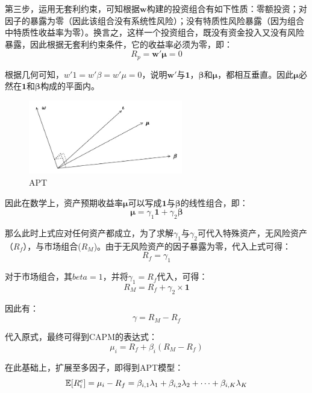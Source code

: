 \documentclass[11pt]{article}
\begin{document}
\begin{appendices}
第三步，运用无套利约束，可知根据$\bm{w}$构建的投资组合有如下性质：零额投资；对因子的暴露为零（因此该组合没有系统性风险）；没有特质性风险暴露（因为组合中特质性收益率为零）。换言之，这样一个投资组合，既没有资金投入又没有风险暴露，因此根据无套利约束条件，它的收益率必须为零，即：
\begin{equation*}
    R_p = \bm{w'\mu} = 0
\end{equation*}

根据几何可知，$w' 1 = w' \beta = w'\mu = 0$，说明$\bm{w'}$与$\bm{1}$，$\bm{\beta}$和$\bm{\mu}$，都相互垂直。因此$\bm{\mu}$必然在$\bm{1}$和$\bm{\beta}$构成的平面内。

\begin{figure}[H]
    \centering
    \includegraphics[width=0.6\textwidth]{fig/apt.jpg}
    \caption{APT}
    \label{fig:apt}
\end{figure}

因此在数学上，资产预期收益率$\bm{\mu}$可以写成$\bm{1}$与$\bm{\beta}$的线性组合，即：
\begin{equation*}
    \bm{\mu} = \gamma_1 \bm{1} + \gamma_2 \bm{\beta}
\end{equation*}

那么此时上式应对任何资产都成立，为了求解$\gamma_1$与$\gamma_2$可代入特殊资产，无风险资产（$R_f$），与市场组合($R_M$)。由于无风险资产的因子暴露为零，代入上式可得：
\begin{equation*}
    R_f = \gamma_1
\end{equation*}

对于市场组合，其$beta=1$，并将$\gamma_1 = R_f$代入，可得：
\begin{equation*}
    R_M = R_f + \gamma_2 \times \bm{1}
\end{equation*}

因此有：
\begin{equation*}
    \gamma = R_M - R_f
\end{equation*}

代入原式，最终可得到CAPM的表达式：
\begin{equation*}
    \mu_i = R_f + \beta_i(R_M - R_f)
\end{equation*}

在此基础上，扩展至多因子，即得到APT模型：
\begin{equation*}
    \mathbb{E}[R_{i}^{e}] = \mu_i - R_f = \beta_{i,1} \lambda_1 + \beta_{i,2} \lambda_2 + \dots + \beta_{i,K} \lambda_K
\end{equation*}

\end{appendices}
\end{document}
